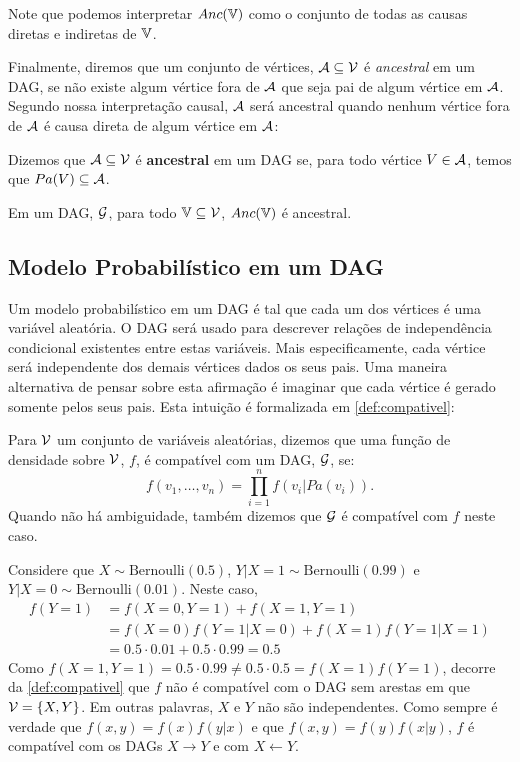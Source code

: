 Note que podemos interpretar $Anc({\mathbb V})$ como
o conjunto de todas as causas diretas e indiretas de ${\mathbb V}$.

Finalmente, diremos que um conjunto de vértices,
${\mathcal A} \subseteq {\mathcal V}$ é \textit{ancestral} em um DAG,
se não existe algum vértice fora de ${\mathcal A}$ que
seja pai de algum vértice em ${\mathcal A}$.
Segundo nossa interpretação causal,
${\mathcal A}$ será ancestral quando 
nenhum vértice fora de ${\mathcal A}$ 
é causa direta de 
algum vértice em ${\mathcal A}$:

\begin{definition}
 \label{def:ancestral}
 Dizemos que ${\mathcal A} \subseteq {\mathcal V}$ é 
 \textbf{ancestral} em um DAG se,
 para todo vértice $V \in {\mathcal A}$, temos que
 $Pa(V) \subseteq {\mathcal A}$.
\end{definition}

\begin{lemma}
 \label{lem:anc}
 Em um DAG, ${\mathcal G}$,
 para todo ${\mathbb V} \subseteq {\mathcal V}$, 
 $Anc({\mathbb V})$ é ancestral.
\end{lemma}

\subsection{Modelo Probabilístico em um DAG}

Um modelo probabilístico em um DAG é
tal que cada um dos vértices é uma variável aleatória.
O DAG será usado para descrever 
relações de independência condicional existentes entre
estas variáveis.
Mais especificamente, cada vértice será
independente dos demais vértices dados os seus pais.
Uma maneira alternativa de pensar sobre esta afirmação é
imaginar que cada vértice é gerado somente pelos seus pais.
Esta intuição é formalizada em \cref{def:compativel}:

\begin{definition}
 \label{def:compativel}
 Para ${\mathcal V}$ um conjunto de variáveis aleatórias,
 dizemos que uma função de densidade sobre ${\mathcal V}$, 
 $f$, é compatível com um DAG, ${\mathcal G}$, se:
 $$f(v_1,\ldots,v_n) = \prod_{i=1}^n f(v_i|Pa(v_i)).$$
 Quando não há ambiguidade, também dizemos que
 ${\mathcal G}$ é compatível com $f$ neste caso.
\end{definition}

\begin{example}
 \label{ex:compativel_1}
 Considere que $X \sim \text{Bernoulli}(0.5)$,
 $Y|X = 1 \sim \text{Bernoulli}(0.99)$ e
 $Y|X = 0 \sim \text{Bernoulli}(0.01)$.
 Neste caso,
 \begin{align*}
  f(Y=1) 
  &= f(X=0,Y=1) + f(X=1,Y=1) \\
  &= f(X=0)f(Y=1|X=0) + f(X=1)f(Y=1|X=1) \\
  &= 0.5 \cdot 0.01 + 0.5 \cdot 0.99 = 0.5
 \end{align*}
 Como $f(X=1,Y=1) = 0.5 \cdot 0.99 \neq 0.5 \cdot 0.5 = f(X=1)f(Y=1)$,
 decorre da \cref{def:compativel} que
 $f$ não é compatível com o DAG sem arestas em que ${\mathcal V} = \{X,Y\}$.
 Em outras palavras, $X$ e $Y$ não são independentes.
 Como sempre é verdade que $f(x,y) = f(x)f(y|x)$ e que
 $f(x,y) = f(y)f(x|y)$, 
 $f$ é compatível com os DAGs 
 $X \rightarrow Y$ e com $X \leftarrow Y$.
\end{example}

